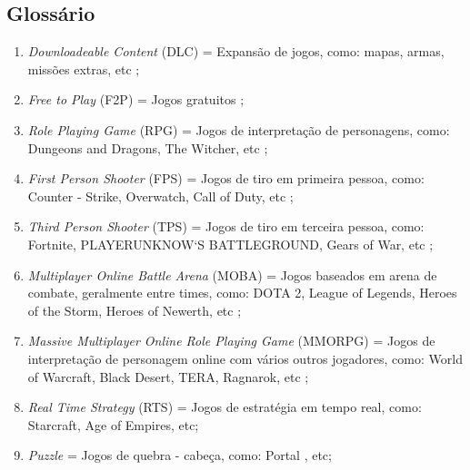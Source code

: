 \documentclass[11pt,a4paper]{article}
\begin{document}
\subsection{Glossário}

\begin{enumerate}[label=(\roman*)]
\item \textit{Downloadeable Content} (DLC) = Expansão de jogos, como: mapas, armas, missões extras, etc ;
\item \textit{Free to Play} (F2P) = Jogos gratuitos ;
\item \textit{Role Playing Game} (RPG) = Jogos de interpretação de personagens, como: Dungeons and Dragons, The Witcher, etc ;
\item \textit{First Person Shooter} (FPS) = Jogos de tiro em primeira pessoa, como: Counter - Strike, Overwatch, Call of Duty, etc ;
\item \textit{Third Person Shooter} (TPS) = Jogos de tiro em terceira pessoa, como: Fortnite, PLAYERUNKNOW`S BATTLEGROUND, Gears of War, etc ;
\item \textit{Multiplayer Online Battle Arena} (MOBA) = Jogos baseados em arena de combate, geralmente entre times, como: DOTA 2, League of Legends, Heroes of the Storm, Heroes of Newerth, etc ;
\item \textit{Massive Multiplayer Online Role Playing Game} (MMORPG) = Jogos de interpretação de personagem online com vários outros jogadores, como: World of Warcraft, Black Desert, TERA, Ragnarok, etc ;
\item \textit{Real Time Strategy} (RTS) = Jogos de estratégia em tempo real, como: Starcraft, Age of Empires, etc;
\item \textit{Puzzle} = Jogos de quebra - cabeça, como: Portal , etc;
\end{enumerate}
\end{document}
